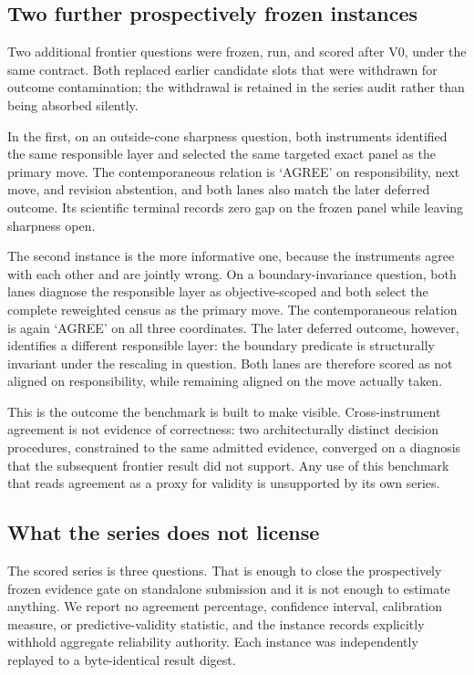 \subsection{Two further prospectively frozen instances}
Two additional frontier questions were frozen, run, and scored after V0, under
the same contract. Both replaced earlier candidate slots that were withdrawn for
outcome contamination; the withdrawal is retained in the series audit rather than
being absorbed silently.

In the first, on an outside-cone sharpness question, both instruments identified
the same responsible layer and selected the same targeted exact panel as the
primary move. The contemporaneous relation is `AGREE' on responsibility, next
move, and revision abstention, and both lanes also match the later deferred
outcome. Its scientific terminal records zero gap on the frozen panel while
leaving sharpness open.

The second instance is the more informative one, because the instruments agree
with each other and are jointly wrong. On a boundary-invariance question, both
lanes diagnose the responsible layer as objective-scoped and both select the
complete reweighted census as the primary move. The contemporaneous relation is
again `AGREE' on all three coordinates. The later deferred outcome, however,
identifies a different responsible layer: the boundary predicate is structurally
invariant under the rescaling in question. Both lanes are therefore scored as
not aligned on responsibility, while remaining aligned on the move actually taken.

This is the outcome the benchmark is built to make visible. Cross-instrument
agreement is not evidence of correctness: two architecturally distinct decision
procedures, constrained to the same admitted evidence, converged on a diagnosis
that the subsequent frontier result did not support. Any use of this benchmark
that reads agreement as a proxy for validity is unsupported by its own series.

\subsection{What the series does not license}
The scored series is three questions. That is enough to close the prospectively
frozen evidence gate on standalone submission and it is not enough to estimate
anything. We report no agreement percentage, confidence interval, calibration
measure, or predictive-validity statistic, and the instance records explicitly
withhold aggregate reliability authority. Each instance was independently
replayed to a byte-identical result digest.